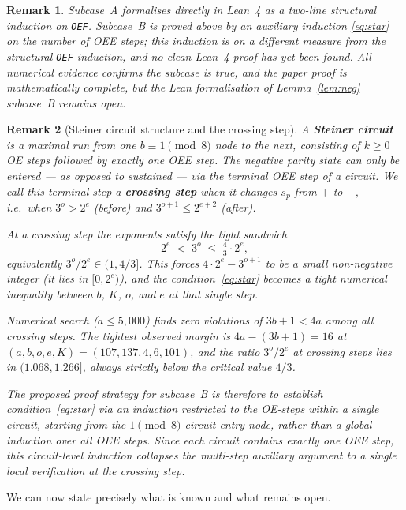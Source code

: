 \documentclass[11pt]{article}
\newtheorem{remark}{Remark}
\begin{document}
\begin{remark}
  Subcase~A formalises directly in Lean~4 as a two-line structural induction
  on \texttt{OEF}.  Subcase~B is proved above by an auxiliary induction
  \eqref{eq:star} on the number of OEE steps; this induction is on a
  \emph{different} measure from the structural \texttt{OEF} induction, and no
  clean Lean~4 proof has yet been found.  All numerical evidence confirms the
  subcase is true, and the paper proof is mathematically complete, but the
  Lean formalisation of Lemma~\ref{lem:neg} subcase~B remains open.
\end{remark}

\begin{remark}[Steiner circuit structure and the crossing step]
\label{rem:circuit}
A \textbf{Steiner circuit} is a maximal run from one $b \equiv 1\pmod{8}$
node to the next, consisting of $k \geq 0$ OE steps followed by exactly one
OEE step.  The negative parity state can only be \emph{entered} — as opposed
to sustained — via the terminal OEE step of a circuit.  We call this terminal
step a \textbf{crossing step} when it changes $s_p$ from $+$ to $-$, i.e.\
when $3^o > 2^e$ (before) and $3^{o+1} \leq 2^{e+2}$ (after).

At a crossing step the exponents satisfy the tight sandwich
\[
  2^e \;<\; 3^o \;\leq\; \tfrac{4}{3} \cdot 2^e,
\]
equivalently $3^o/2^e \in (1, 4/3]$.  This forces $4 \cdot 2^e - 3^{o+1}$
to be a small non-negative integer (it lies in $[0, 2^e)$), and the
condition~\eqref{eq:star} becomes a tight numerical inequality between $b$,
$K$, $o$, and $e$ at that single step.

Numerical search ($a \leq 5{,}000$) finds zero violations of $3b+1 < 4a$
among all crossing steps.  The tightest observed margin is
$4a - (3b+1) = 16$ at $(a, b, o, e, K) = (107, 137, 4, 6, 101)$, and the
ratio $3^o/2^e$ at crossing steps lies in $(1.068, 1.266]$, always strictly
below the critical value $4/3$.

The proposed proof strategy for subcase~B is therefore to establish
condition~\eqref{eq:star} via an induction restricted to the OE-steps
\emph{within a single circuit}, starting from the $1\pmod{8}$ circuit-entry
node, rather than a global induction over all OEE steps.  Since each circuit
contains exactly one OEE step, this circuit-level induction collapses
the multi-step auxiliary argument to a single local verification at the
crossing step.
\end{remark}

We can now state precisely what is known and what remains open.
\end{document}
